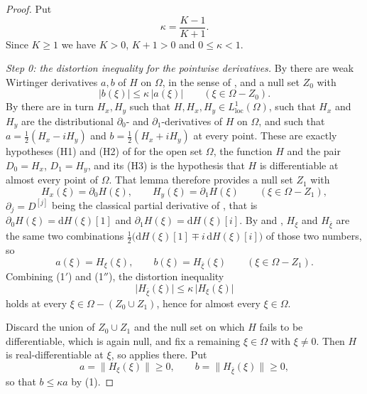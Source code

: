 \begin{proof}
Put
\[
  \kappa=\frac{K-1}{K+1} .
\]
Since $K\ge1$ we have $K>0$, $K+1>0$ and $0\le\kappa<1$.

\emph{Step 0: the distortion inequality for the pointwise derivatives.}  By
 there are weak Wirtinger derivatives $a,b$ of $H$ on
$\Omega$, in the sense of , and a null set $Z_0$
with
\begin{equation}\tag{1$'$}
  \bigl|b(\xi)\bigr|\le\kappa\,\bigl|a(\xi)\bigr|
  \qquad(\xi\in\Omega-Z_0).
\end{equation}
By  there are in turn $H_x,H_y$ such that
$H,H_x,H_y\in L^1_{\mathrm{loc}}(\Omega)$, such that $H_x$ and $H_y$ are the
distributional $\partial_0$- and $\partial_1$-derivatives of $H$ on $\Omega$,
and such that $a=\tfrac12(H_x-iH_y)$ and $b=\tfrac12(H_x+iH_y)$ at every
point.  These are exactly hypotheses (H1) and (H2) of
 for the open set $\Omega$, the function $H$
and the pair $D_0=H_x$, $D_1=H_y$, and its (H3) is the hypothesis that $H$ is
differentiable at almost every point of $\Omega$.  That lemma therefore
provides a null set $Z_1$ with
\[
  H_x(\xi)=\partial_0H(\xi),\qquad H_y(\xi)=\partial_1H(\xi)
  \qquad(\xi\in\Omega-Z_1),
\]
$\partial_j=D^{[j]}$ being the classical partial derivative of
, that is $\partial_0H(\xi)=\mathrm{d}H(\xi)[1]$ and
$\partial_1H(\xi)=\mathrm{d}H(\xi)[i]$.  By  and ,
$H_\xi$ and $H_{\bar\xi}$ are the same two combinations
$\tfrac12\bigl(\mathrm{d}H(\xi)[1]\mp i\,\mathrm{d}H(\xi)[i]\bigr)$ of those
two numbers, so
\begin{equation}\tag{1$''$}
  a(\xi)=H_\xi(\xi),\qquad b(\xi)=H_{\bar\xi}(\xi)
  \qquad(\xi\in\Omega-Z_1).
\end{equation}
Combining (1$'$) and (1$''$), the distortion inequality
\begin{equation}\tag{1}
  \bigl|H_{\bar\xi}(\xi)\bigr|\le\kappa\,\bigl|H_\xi(\xi)\bigr|
\end{equation}
holds at every $\xi\in\Omega-(Z_0\cup Z_1)$, hence for almost every
$\xi\in\Omega$.

Discard the union of $Z_0\cup Z_1$ and the null set on which $H$ fails to be
differentiable, which is again null, and fix a remaining $\xi\in\Omega$ with
$\xi\neq0$.  Then $H$ is
real-differentiable at $\xi$, so  applies there.
Put
\[
  a=\bigl\|H_\xi(\xi)\bigr\|\ge0,\qquad b=\bigl\|H_{\bar\xi}(\xi)\bigr\|\ge0,
\]
so that $b\le\kappa a$ by (1).


\end{proof}
